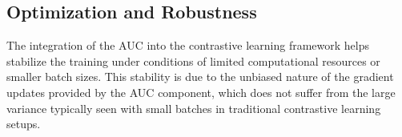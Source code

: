 \subsection{Optimization and Robustness}
The integration of the AUC into the contrastive learning framework helps stabilize the training under conditions of limited computational resources or smaller batch sizes. This stability is due to the unbiased nature of the gradient updates provided by the AUC component, which does not suffer from the large variance typically seen with small batches in traditional contrastive learning setups.
